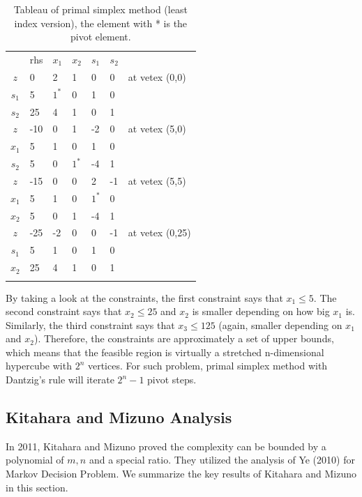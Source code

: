 \documentclass[11pt]{article}
\begin{document}
\begin{table}[H]
\caption{Tableau of primal simplex method (least index version), the element with * is the pivot element. }
\label{Table: tableau}
\centering
\begin{tabular}{c|llllll}
   & rhs & $x_1$ & $x_2$ & $s_1$ & $s_2$ &                 \\ \cline{1-6}
$z$  & 0   & 2  & 1  & 0  & 0  & at vetex (0,0)  \\
$s_1$ & 5   & $1^*$  & 0  & 1  & 0  &                 \\
$s_2$ & 25  & 4  & 1  & 0  & 1  &                 \\ \hhline{======}
$z$  & -10 & 0  & 1  & -2 & 0  & at vetex (5,0)  \\
$x_1$ & 5   & 1  & 0  & 1  & 0  &                 \\
$s_2$ & 5   & 0  & $1^*$  & -4 & 1  &                 \\ \hhline{======}
$z$  & -15 & 0  & 0  & 2  & -1 & at vetex (5,5)  \\
$x_1$ & 5   & 1  & 0  & $1^*$  & 0  &                 \\
$x_2$ & 5   & 0  & 1  & -4 & 1  &                 \\ \hhline{======}
$z$  & -25 & -2 & 0  & 0  & -1 & at vetex (0,25) \\
$s_1$ & 5   & 1  & 0  & 1  & 0  &                 \\
$x_2$ & 25  & 4  & 1  & 0  & 1  &                 \\ \hhline{======}
\end{tabular}
\end{table}
By taking a look at the constraints, the first constraint says that $x_1 \le 5$. The second constraint says that $x_2 \le 25$ and $x_2$ is smaller depending on how big $x_1$ is. Similarly, the third constraint says that $x_3 \le 125$ (again, smaller depending on $x_1$ and $x_2$). Therefore, the constraints are approximately a set of upper bounds, which means that the feasible region is virtually a stretched n-dimensional hypercube with $2^n$ vertices. For such problem, primal simplex method with Dantzig's rule will iterate $2^n -1$ pivot steps.

\subsection{Kitahara and Mizuno Analysis} \label{seckita}
In 2011, Kitahara and Mizuno \cite{kitahara2013bound} proved the complexity can be bounded by a polynomial of $m, n$ and a special ratio. They utilized the analysis of Ye (2010) \cite{ye2010simplex} for Markov Decision Problem. We summarize the key results of Kitahara and Mizuno \cite{kitahara2013bound} in this section. 
\end{document}
